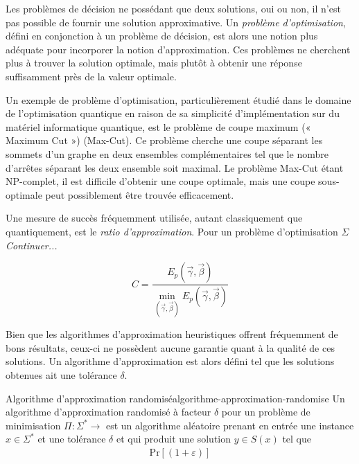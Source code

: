 Les problèmes de décision ne possédant que deux solutions, oui ou non, il n'est pas possible de fournir une solution approximative. Un \textit{problème d'optimisation}, défini en conjonction à un problème de décision, est alors une notion plus adéquate pour incorporer la notion d'approximation. Ces problèmes ne cherchent plus à trouver la solution optimale, mais plutôt à obtenir une réponse suffisamment près de la valeur optimale. 

Un exemple de problème d'optimisation, particulièrement étudié dans le domaine de l'optimisation quantique en raison de sa simplicité d'implémentation sur du matériel informatique quantique, est le problème de coupe maximum (­« Maximum Cut ») (Max-Cut). Ce problème cherche une coupe séparant les sommets d'un graphe en deux ensembles complémentaires tel que le nombre d'arrêtes séparant les deux ensemble soit maximal. Le problème Max-Cut étant \textsf{NP}-complet, il est difficile d'obtenir une coupe optimale, mais une coupe sous-optimale peut possiblement être trouvée efficacement.

Une mesure de succès fréquemment utilisée, autant classiquement que quantiquement, est le \textit{ratio d'approximation}. Pour un problème d'optimisation $\Sigma$ \textcolor{mydarkred}{\textit{Continuer...}}

\begin{equation}
    C = \frac{ E_{p} (\vec{\gamma}, \vec{\beta})}{\min_{(\vec{\gamma}, \vec{\beta})} E_{p} (\vec{\gamma}, \vec{\beta}) }
\end{equation}

Bien que les algorithmes d'approximation heuristiques offrent fréquemment de bons résultats, ceux-ci ne possèdent aucune garantie quant à la qualité de ces solutions. Un algorithme d'approximation est alors défini tel que les solutions obtenues ait une tolérance $\delta$. 

\begin{subtheorem}{Algorithme d'approximation randomisé}{algorithme-approximation-randomise}
    Un algorithme d'approximation randomisé à facteur $\delta$ pour un problème de minimisation $\Pi: \Sigma^{*} \to  $ est un algorithme aléatoire prenant en entrée une instance $x \in \Sigma^{*}$ et une tolérance $\delta$ et qui produit une solution $y \in S(x)$ tel que
    \begin{align}
        \mathrm{ Pr } [(1+\varepsilon)]
    \end{align}
\end{subtheorem}


